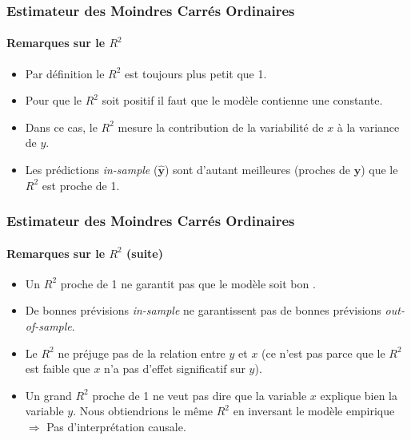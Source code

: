 \documentclass[10pt]{beamer}
\theoremstyle{plain}
\begin{document}
\begin{frame}
  \frametitle{Estimateur des Moindres Carrés Ordinaires}
  \framesubtitle {Remarques sur le  $R^2$}

  \begin{itemize}

  \item Par définition le $R^2$ est toujours plus petit que 1.\newline

  \item Pour que le $R^2$ soit positif il faut que le modèle contienne
    une constante.\newline

  \item Dans ce cas, le $R^2$ mesure la contribution de la variabilité de $x$ à la variance de $y$.\newline

  \item Les prédictions \textit{in-sample} ($\hat{\mathbf y}$) sont d'autant meilleures (proches de $\mathbf y$) que le $R^2$ est proche de 1.\newline

  \end{itemize}

\end{frame}


\begin{frame}
  \frametitle{Estimateur des Moindres Carrés Ordinaires}
  \framesubtitle {Remarques sur le  $R^2$ (suite)}


  \begin{itemize}

  \item Un $R^2$ proche de 1 ne garantit pas que le modèle soit \og bon \fg{}.\newline

  \item De bonnes prévisions \textit{in-sample} ne garantissent pas de bonnes prévisions \textit{out-of-sample}.\newline

  \item Le $R^2$ ne préjuge pas de la relation entre $y$ et $x$ (ce n'est pas parce que le $R^2$ est faible que $x$ n'a pas d'effet significatif sur $y$).\newline

  \item Un grand $R^2$ proche de 1 ne veut pas dire que la variable $x$ explique  \og bien \fg{} la variable $y$. Nous obtiendrions le même  $R^2$ en inversant le modèle empirique $\Rightarrow$ Pas d'interprétation causale.

  \end{itemize}

\end{frame}
\end{document}
